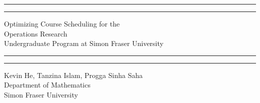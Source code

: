 \documentclass{article}
\begin{document}
 

\begin{titlepage} 

	\centering 
	
	
	\vspace*{\baselineskip} 
	
	
	\rule{\textwidth}{1.6pt}\vspace*{-\baselineskip}\vspace*{2pt} 
	\rule{\textwidth}{0.4pt} 
	
	\vspace{0.75\baselineskip} 
	
	{\LARGE Optimizing Course Scheduling for the\\ Operations Research\\ Undergraduate Program at Simon Fraser University\\} %
	
	\vspace{0.75\baselineskip} %
	
	\rule{\textwidth}{1pt}\vspace*{-\baselineskip}\vspace{3.2pt} %
	\rule{\textwidth}{2pt} %
	
	\vspace{1\baselineskip} %
	
	
	
	
	
	\vspace{1\baselineskip} %
	
	{\Large Kevin He, Tanzina Islam, Progga Sinha Saha\\}
	Department of Mathematics\\
	Simon Fraser University%
	

\end{titlepage}
\end{document}

